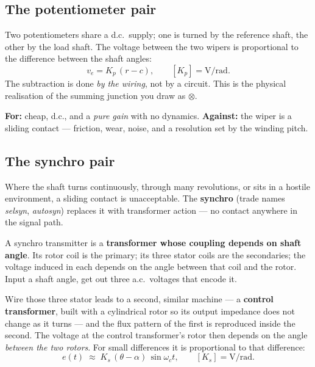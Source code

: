 \documentclass[11pt,a4paper]{article}
\begin{document}
\subsection*{The potentiometer pair}

Two potentiometers share a d.c.\ supply; one is turned by the reference shaft,
the other by the load shaft. The voltage between the two wipers is proportional
to the difference between the shaft angles:
\[
  v_{e}=K_{p}\,(r-c),\qquad [K_{p}]=\si{\volt\per\radian}.
\]
The subtraction is done \emph{by the wiring}, not by a circuit. This is the
physical realisation of the summing junction you draw as $\otimes$.

\smallskip
\textbf{For:} cheap, d.c., and a \emph{pure gain} with no dynamics.
\textbf{Against:} the wiper is a sliding contact --- friction, wear, noise, and
a resolution set by the winding pitch.

\subsection*{The synchro pair}

Where the shaft turns continuously, through many revolutions, or sits in a
hostile environment, a sliding contact is unacceptable. The \textbf{synchro}
(trade names \emph{selsyn}, \emph{autosyn}) replaces it with transformer action
--- no contact anywhere in the signal path.

\begin{keyidea}
A synchro transmitter is a \textbf{transformer whose coupling depends on shaft
angle}. Its rotor coil is the primary; its three stator coils are the
secondaries; the voltage induced in each depends on the angle between that
coil and the rotor. Input a shaft angle, get out three a.c.\ voltages that
encode it.
\end{keyidea}

Wire those three stator leads to a second, similar machine --- a \textbf{control
transformer}, built with a cylindrical rotor so its output impedance does not
change as it turns --- and the flux pattern of the first is reproduced inside
the second. The voltage at the control transformer's rotor then depends on the
angle \emph{between the two rotors}. For small differences it is proportional
to that difference:
\[
  e(t)\;\approx\;K_{s}\,(\theta-\alpha)\,\sin\omega_{c}t,
  \qquad [K_{s}]=\si{\volt\per\radian}.
\]
\end{document}
